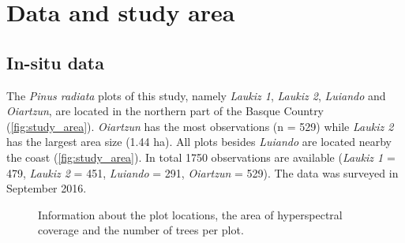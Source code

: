 \documentclass[review]{elsarticle}
\begin{document}
\section{Data and study area}

\subsection{In-situ data}

The \textit{Pinus radiata} plots of this study, namely \textit{Laukiz 1}, \textit{Laukiz 2}, \textit{Luiando} and \textit{Oiartzun}, are located in the northern part of the Basque Country (\autoref{fig:study_area}).
\textit{Oiartzun} has the most observations (n = 529) while \textit{Laukiz 2} has the largest area size (1.44 ha).
All plots besides \textit{Luiando} are located nearby the coast (\autoref{fig:study_area}).
In total 1750 observations are available (\textit{Laukiz 1} = 479, \textit{Laukiz 2} = 451, \textit{Luiando} = 291, \textit{Oiartzun} = 529).
The data was surveyed in September 2016.

\begin{figure} [b!]
	\begin{center}
		\caption{Information about the plot locations, the area of hyperspectral coverage and the number of trees per plot.}
		\label{fig:study_area}
	\end{center}
\end{figure}
\end{document}
